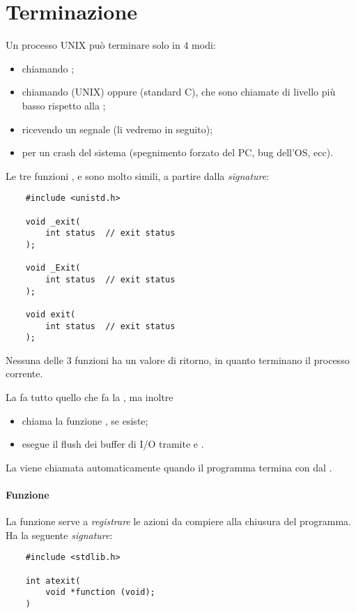 \section{Terminazione}

Un processo UNIX può terminare solo in $4$ modi:
\begin{itemize}
    \item chiamando ;
    \item chiamando  (UNIX) oppure  (standard C), che sono chiamate di livello più basso rispetto alla ;
    \item ricevendo un segnale (li vedremo in seguito);
    \item per un crash del sistema (spegnimento forzato del PC, bug dell'OS, ecc).
\end{itemize}

Le tre funzioni ,  e  sono molto simili, a partire dalla \emph{signature}:
\begin{verbatim}
    #include <unistd.h>

    void _exit(
        int status  // exit status
    );
    
    void _Exit(
        int status  // exit status
    );
    
    void exit(
        int status  // exit status
    );
\end{verbatim}

Nessuna delle $3$ funzioni ha un valore di ritorno, in quanto terminano il processo corrente.

La  fa tutto quello che fa la , ma inoltre \begin{itemize}
    \item chiama la funzione , se esiste;
    \item esegue il flush dei buffer di \textsf{I/O} tramite  e .
\end{itemize}

La  viene chiamata automaticamente quando il programma termina con  dal .

\paragraph{Funzione } La funzione  serve a \emph{registrare} le azioni da compiere alla chiusura del programma. Ha la seguente \emph{signature}:
\begin{verbatim}
    #include <stdlib.h>

    int atexit(
        void *function (void); 
    )
\end{verbatim}

